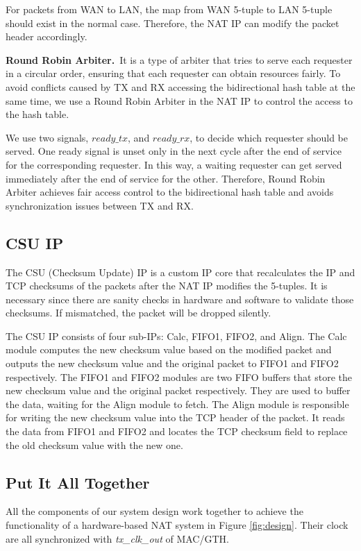     For packets from WAN to LAN, the map from WAN 5-tuple to LAN 5-tuple should exist in the normal case. Therefore, the NAT IP can modify the packet header accordingly.

    \textbf{Round Robin Arbiter.}\ It is a type of arbiter that tries to serve each requester in a circular order, ensuring that each requester can obtain resources fairly. To avoid conflicts caused by TX and RX accessing the bidirectional hash table at the same time, we use a Round Robin Arbiter in the NAT IP to control the access to the hash table. 

    We use two signals, $ready\_tx$, and $ready\_rx$, to decide which requester should be served. One ready signal is unset only in the next cycle after the end of service for the corresponding requester. In this way, a waiting requester can get served immediately after the end of service for the other. Therefore, Round Robin Arbiter achieves fair access control to the bidirectional hash table and avoids synchronization issues between TX and RX.
    
\subsection{CSU IP}
    The CSU (Checksum Update) IP is a custom IP core that recalculates the IP and TCP checksums of the packets after the NAT IP modifies the 5-tuples. It is necessary since there are sanity checks in hardware and software to validate those checksums. If mismatched, the packet will be dropped silently. 
    
    The CSU IP consists of four sub-IPs: Calc, FIFO1, FIFO2, and Align. 
    The Calc module computes the new checksum value based on the modified packet and outputs the new checksum value and the original packet to FIFO1 and FIFO2 respectively.
    The FIFO1 and FIFO2 modules are two FIFO buffers that store the new checksum value and the original packet respectively. They are used to buffer the data, waiting for the Align module to fetch. 
    The Align module is responsible for writing the new checksum value into the TCP header of the packet. It reads the data from FIFO1 and FIFO2 and locates the TCP checksum field to replace the old checksum value with the new one.


\subsection{Put It All Together}

    All the components of our system design work together to achieve the functionality of a hardware-based NAT system in Figure \ref{fig:design}. Their clock are all synchronized with \emph{tx\_clk\_out} of MAC/GTH.

